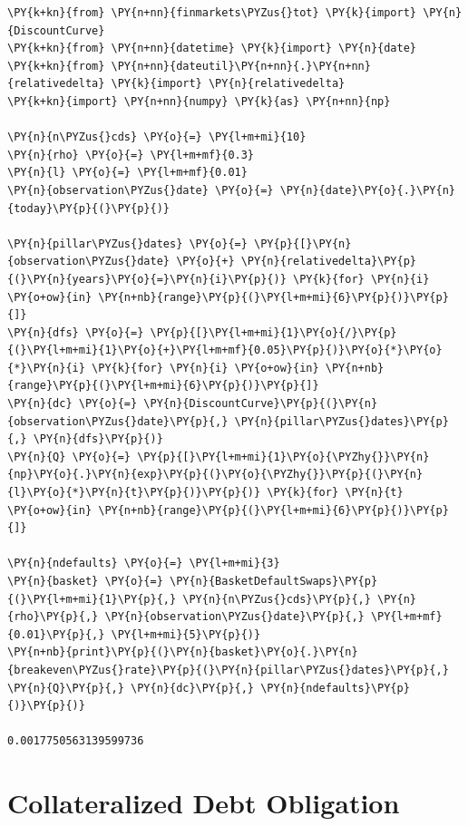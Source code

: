 \begin{tcolorbox}[breakable, size=fbox, boxrule=1pt, pad at break*=1mm,colback=cellbackground, colframe=cellborder]
\begin{Verbatim}[commandchars=\\\{\}]
\PY{k+kn}{from} \PY{n+nn}{finmarkets\PYZus{}tot} \PY{k}{import} \PY{n}{DiscountCurve}
\PY{k+kn}{from} \PY{n+nn}{datetime} \PY{k}{import} \PY{n}{date}
\PY{k+kn}{from} \PY{n+nn}{dateutil}\PY{n+nn}{.}\PY{n+nn}{relativedelta} \PY{k}{import} \PY{n}{relativedelta}
\PY{k+kn}{import} \PY{n+nn}{numpy} \PY{k}{as} \PY{n+nn}{np}
	
\PY{n}{n\PYZus{}cds} \PY{o}{=} \PY{l+m+mi}{10}
\PY{n}{rho} \PY{o}{=} \PY{l+m+mf}{0.3}
\PY{n}{l} \PY{o}{=} \PY{l+m+mf}{0.01}
\PY{n}{observation\PYZus{}date} \PY{o}{=} \PY{n}{date}\PY{o}{.}\PY{n}{today}\PY{p}{(}\PY{p}{)}
	
\PY{n}{pillar\PYZus{}dates} \PY{o}{=} \PY{p}{[}\PY{n}{observation\PYZus{}date} \PY{o}{+} \PY{n}{relativedelta}\PY{p}{(}\PY{n}{years}\PY{o}{=}\PY{n}{i}\PY{p}{)} \PY{k}{for} \PY{n}{i} \PY{o+ow}{in} \PY{n+nb}{range}\PY{p}{(}\PY{l+m+mi}{6}\PY{p}{)}\PY{p}{]}
\PY{n}{dfs} \PY{o}{=} \PY{p}{[}\PY{l+m+mi}{1}\PY{o}{/}\PY{p}{(}\PY{l+m+mi}{1}\PY{o}{+}\PY{l+m+mf}{0.05}\PY{p}{)}\PY{o}{*}\PY{o}{*}\PY{n}{i} \PY{k}{for} \PY{n}{i} \PY{o+ow}{in} \PY{n+nb}{range}\PY{p}{(}\PY{l+m+mi}{6}\PY{p}{)}\PY{p}{]}
\PY{n}{dc} \PY{o}{=} \PY{n}{DiscountCurve}\PY{p}{(}\PY{n}{observation\PYZus{}date}\PY{p}{,} \PY{n}{pillar\PYZus{}dates}\PY{p}{,} \PY{n}{dfs}\PY{p}{)}
\PY{n}{Q} \PY{o}{=} \PY{p}{[}\PY{l+m+mi}{1}\PY{o}{\PYZhy{}}\PY{n}{np}\PY{o}{.}\PY{n}{exp}\PY{p}{(}\PY{o}{\PYZhy{}}\PY{p}{(}\PY{n}{l}\PY{o}{*}\PY{n}{t}\PY{p}{)}\PY{p}{)} \PY{k}{for} \PY{n}{t} \PY{o+ow}{in} \PY{n+nb}{range}\PY{p}{(}\PY{l+m+mi}{6}\PY{p}{)}\PY{p}{]}
	
\PY{n}{ndefaults} \PY{o}{=} \PY{l+m+mi}{3}
\PY{n}{basket} \PY{o}{=} \PY{n}{BasketDefaultSwaps}\PY{p}{(}\PY{l+m+mi}{1}\PY{p}{,} \PY{n}{n\PYZus{}cds}\PY{p}{,} \PY{n}{rho}\PY{p}{,} \PY{n}{observation\PYZus{}date}\PY{p}{,} \PY{l+m+mf}{0.01}\PY{p}{,} \PY{l+m+mi}{5}\PY{p}{)}
\PY{n+nb}{print}\PY{p}{(}\PY{n}{basket}\PY{o}{.}\PY{n}{breakeven\PYZus{}rate}\PY{p}{(}\PY{n}{pillar\PYZus{}dates}\PY{p}{,} \PY{n}{Q}\PY{p}{,} \PY{n}{dc}\PY{p}{,} \PY{n}{ndefaults}\PY{p}{)}\PY{p}{)}

0.0017750563139599736
\end{Verbatim}
\end{tcolorbox}


\section{Collateralized Debt Obligation}\label{collateralized-debt-obligation}

